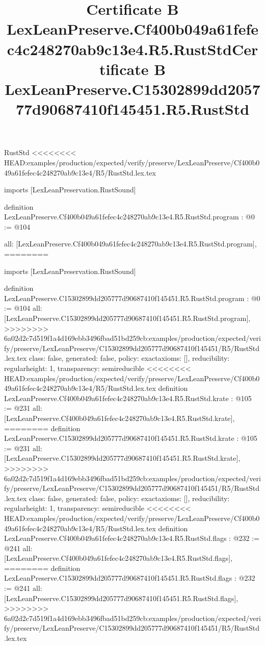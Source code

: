 \begin{lexlean}{RustStd}
<<<<<<<< HEAD:examples/production/expected/verify/preserve/LexLeanPreserve/Cf400b049a61fefec4c248270ab9c13e4/R5/RustStd.lex.tex
\title{Certificate B LexLeanPreserve.Cf400b049a61fefec4c248270ab9c13e4.R5.RustStd}
\begin{coremodule}
imports [LexLeanPreservation.RustSound]

definition LexLeanPreserve.Cf400b049a61fefec4c248270ab9c13e4.R5.RustStd.program : @0 := @104 {
  all: [LexLeanPreserve.Cf400b049a61fefec4c248270ab9c13e4.R5.RustStd.program],
========
\title{Certificate B LexLeanPreserve.C15302899dd205777d90687410f145451.R5.RustStd}
\begin{coremodule}
imports [LexLeanPreservation.RustSound]

definition LexLeanPreserve.C15302899dd205777d90687410f145451.R5.RustStd.program : @0 := @104 {
  all: [LexLeanPreserve.C15302899dd205777d90687410f145451.R5.RustStd.program],
>>>>>>>> 6a02d2c7d519f1a4d169ebb3496fbad51bd259cb:examples/production/expected/verify/preserve/LexLeanPreserve/C15302899dd205777d90687410f145451/R5/RustStd.lex.tex
  class: false,
  generated: false,
  policy: exact{axioms: []},
  reducibility: regular{height: 1},
  transparency: semireducible
}
<<<<<<<< HEAD:examples/production/expected/verify/preserve/LexLeanPreserve/Cf400b049a61fefec4c248270ab9c13e4/R5/RustStd.lex.tex
definition LexLeanPreserve.Cf400b049a61fefec4c248270ab9c13e4.R5.RustStd.krate : @105 := @231 {
  all: [LexLeanPreserve.Cf400b049a61fefec4c248270ab9c13e4.R5.RustStd.krate],
========
definition LexLeanPreserve.C15302899dd205777d90687410f145451.R5.RustStd.krate : @105 := @231 {
  all: [LexLeanPreserve.C15302899dd205777d90687410f145451.R5.RustStd.krate],
>>>>>>>> 6a02d2c7d519f1a4d169ebb3496fbad51bd259cb:examples/production/expected/verify/preserve/LexLeanPreserve/C15302899dd205777d90687410f145451/R5/RustStd.lex.tex
  class: false,
  generated: false,
  policy: exact{axioms: []},
  reducibility: regular{height: 1},
  transparency: semireducible
}
<<<<<<<< HEAD:examples/production/expected/verify/preserve/LexLeanPreserve/Cf400b049a61fefec4c248270ab9c13e4/R5/RustStd.lex.tex
definition LexLeanPreserve.Cf400b049a61fefec4c248270ab9c13e4.R5.RustStd.flags : @232 := @241 {
  all: [LexLeanPreserve.Cf400b049a61fefec4c248270ab9c13e4.R5.RustStd.flags],
========
definition LexLeanPreserve.C15302899dd205777d90687410f145451.R5.RustStd.flags : @232 := @241 {
  all: [LexLeanPreserve.C15302899dd205777d90687410f145451.R5.RustStd.flags],
>>>>>>>> 6a02d2c7d519f1a4d169ebb3496fbad51bd259cb:examples/production/expected/verify/preserve/LexLeanPreserve/C15302899dd205777d90687410f145451/R5/RustStd.lex.tex
}}}
\end{coremodule}}
\end{coremodule}
\end{lexlean}
